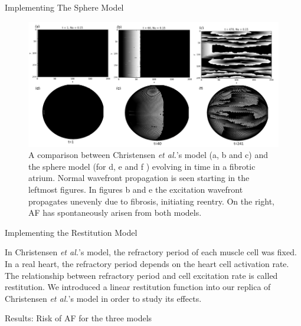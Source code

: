 \documentclass[final,hyperref={pdfpagelabels=false}]{beamer}
\begin{document}
\begin{frame}[t]
\begin{columns}[t]
\begin{column}{.465\textwidth}
\begin{block}{Implementing The Sphere Model}
\begin{figure}
\includegraphics[width=0.8\linewidth]{combchristensenspherefib}
\caption{A comparison between Christensen \emph{et al.}'s model  (a, b and c)  and the sphere model (for d, e and f ) evolving in time in a fibrotic atrium. Normal wavefront propagation is seen starting in the leftmost figures. In figures b and e the excitation wavefront propagates unevenly due to fibrosis, initiating reentry. On the right, AF has spontaneously arisen from both models.}
\end{figure}

\end{block}

\begin{block}{Implementing the Restitution Model}

In Christensen \emph{et al.}'s model, the refractory period of each muscle cell was fixed.
In a real heart, the refractory period depends on the heart cell activation rate. The relationship between refractory period and cell excitation rate is called restitution. We introduced a linear restitution function into our replica of Christensen \emph{et al.}'s model in order to study its effects.
\end{block}


\begin{block}{Results: Risk of AF for the three models}


\end{block}
\end{column}
\end{columns}
\end{frame}
\end{document}
